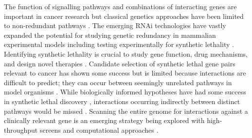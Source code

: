 

The function of signalling pathways and combinations of interacting genes are important in cancer research but classical genetics approaches have been limited to non-redundant pathways \citep{Fraser2004}. The emerging RNAi technologies have vastly expanded the potential for studying genetic redundancy in mammalian experimental models including testing experimentally for synthetic lethality \citep{Fraser2004}. Identifying synthetic lethality is crucial to study gene function, drug mechanisms, and design novel therapies \citep{Lum2004}. Candidate selection of synthetic lethal gene pairs relevant to cancer has shown some success but is limited because interactions are difficult to predict; they can occur between seemingly unrelated pathways in model organisms \citep{Costanzo2011}. While biologically informed hypotheses have had some success in synthetic lethal discovery \citep{Bitler2015, Bryant2005, Farmer2005}, interactions occurring indirectly between distinct pathways would be missed \citep{Boone2007, Costanzo2011}. Scanning the entire genome for interactions against a clinically relevant gene is an emerging strategy being explored with high-throughput screens \citep{Fece2015} and computational approaches \citep{Boucher2013, vanSteen2011}.  

